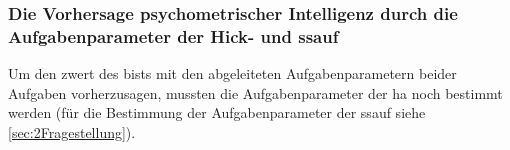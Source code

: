 \documentclass[11pt, twoside, a4paper]{book}		%
\begin{document}





\subsubsection*{Die Vorhersage psychometrischer Intelligenz durch die Aufgabenparameter der Hick- und \gls{ssauf} \label{subsec:Aufgabenparameter_Hick}}

Um den \gls{zwert} des \gls{bist}s mit den abgeleiteten Aufgabenparametern beider Aufgaben vorherzusagen, mussten die Aufgabenparameter der \gls{ha} noch bestimmt werden (für die Bestimmung der Aufgabenparameter der \gls{ssauf} siehe \autoref{sec:2Fragestellung}). 
\end{document}
